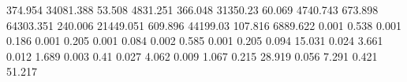 374.954    34081.388  %
53.508     4831.251   %
366.048    31350.23   %
60.069     4740.743   %
673.898    64303.351  %
240.006    21449.051  %
609.896    44199.03   %
107.816    6889.622   %
0.001      0.538      %
0.001      0.186      %
0.001      0.205      %
0.001      0.084      %
0.002      0.585      %
0.001      0.205      %
0.094      15.031     %
0.024      3.661      %
0.012      1.689      %
0.003      0.41       %
0.027      4.062      %
0.009      1.067      %
0.215      28.919     %
0.056      7.291      %
0.421      51.217     %
